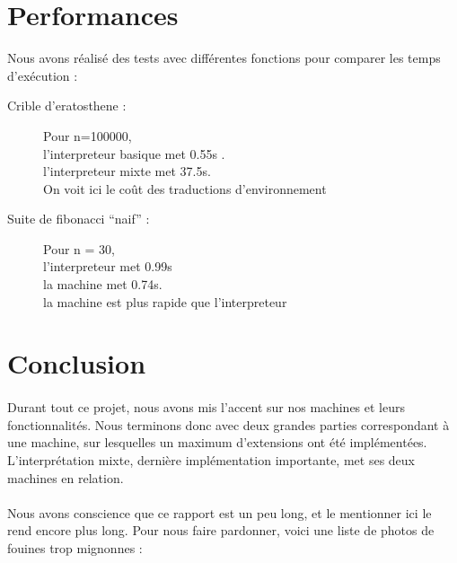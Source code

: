 \section{Performances}

Nous avons réalisé des tests avec différentes fonctions pour comparer les temps d'exécution :
\begin{description}
 \item[Crible d'eratosthene :] Pour n=100000, \\
			       l'interpreteur basique met 0.55s . \\
			       l'interpreteur mixte met 37.5s. \\
On voit ici le coût des traductions d'environnement
 \item[Suite de fibonacci ``naif'' : ] Pour n = 30, \\
				       l'interpreteur met 0.99s \\
				       la machine met 0.74s. \\
				       la machine est plus rapide que l'interpreteur

\end{description}

\section*{Conclusion}

\paragraph{} Durant tout ce projet, nous avons mis l'accent sur nos machines et leurs fonctionnalités. Nous terminons donc avec deux grandes parties correspondant à une machine, sur lesquelles un maximum d'extensions ont été implémentées. L'interprétation mixte, dernière implémentation importante, met ses deux machines en relation.

\paragraph{} Nous avons conscience que ce rapport est un peu long, et le mentionner ici le rend encore plus long. Pour nous faire pardonner, voici une liste de photos de fouines trop mignonnes : \\


